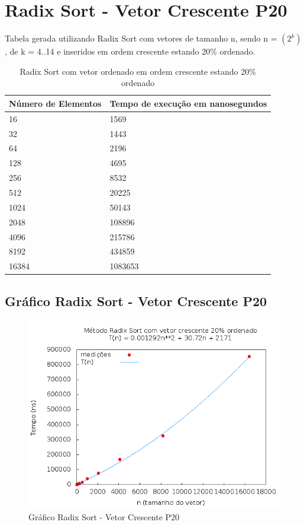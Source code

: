 \documentclass[12pt,a4paper,twoside]{report}
\begin{document}
\section{Radix Sort - Vetor Crescente P20}
Tabela gerada utilizando Radix Sort com vetores de tamanho n, sendo n = $(2^k)$, de k = 4..14 e inseridos em ordem crescente estando 20\% ordenado.
\begin{table}[H]
\centering
\caption{Radix Sort com vetor ordenado em ordem crescente estando 20\% ordenado}
\label{my-label}
\begin{tabular}{|l|l|}
\hline
\multicolumn{1}{|c|}{\textbf{Número de Elementos}} & \multicolumn{1}{c|}{\textbf{Tempo de execução em nanosegundos}} \\ \hline
16 & 1569 \\ \hline
32 & 1443 \\ \hline
64 & 2196 \\ \hline
128 & 4695 \\ \hline
256 & 8532 \\ \hline
512 & 20225 \\ \hline
1024 & 50143 \\ \hline
2048 & 108896 \\ \hline
4096 & 215786 \\ \hline
8192 & 434859 \\ \hline
16384 & 1083653 \\ \hline
\end{tabular}
\end{table}

\subsection{Gráfico Radix Sort - Vetor Crescente P20}
\begin{figure}[H]
    \centering
    \includegraphics[width=0.7\linewidth]{graficos/RadixSort/vIntCrescenteP20/vIntCrescenteP20.png}
  \caption{Gráfico Radix Sort - Vetor Crescente P20}
\end{figure}
\end{document}
